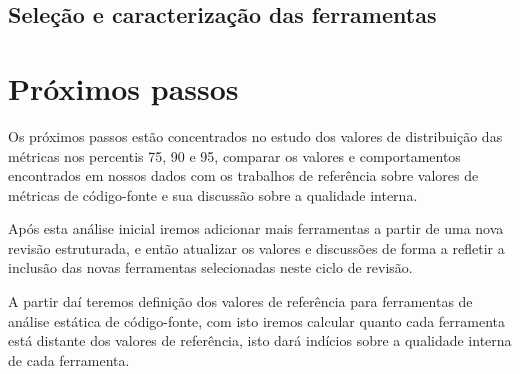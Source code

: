  \label{conclusoes}

\subsection{Seleção e caracterização das ferramentas}

\section{Próximos passos}

Os próximos passos estão concentrados no estudo dos valores de distribuição
das métricas nos percentis 75, 90 e 95, comparar os valores e comportamentos
encontrados em nossos dados com os trabalhos de referência sobre valores de
métricas de código-fonte e sua discussão sobre a qualidade interna.

Após esta análise inicial iremos adicionar mais ferramentas a partir de uma
nova revisão estruturada, e então atualizar os valores e discussões de forma a
refletir a inclusão das novas ferramentas selecionadas neste ciclo de revisão.

A partir daí teremos definição dos valores de referência para ferramentas de
análise estática de código-fonte, com isto iremos calcular quanto cada
ferramenta está distante dos valores de referência, isto dará indícios sobre a
qualidade interna de cada ferramenta.
